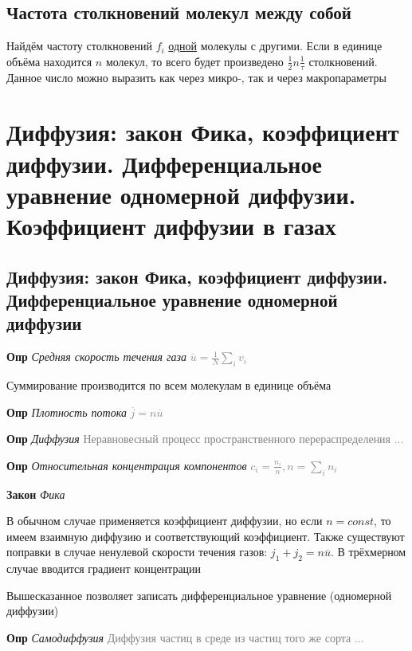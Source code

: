 \documentclass[a4paper, 14pt]{article}
\begin{document}
    \subsection{Частота столкновений молекул между собой}
    
    Найдём частоту столкновений $f_i$ \underline{одной} молекулы с другими.
    Если в единице объёма находится $n$ молекул, то всего будет произведено $\frac{1}{2}n \frac{1}{\tau}$ столкновений.
    Данное число можно выразить как через микро-, так и через макропараметры
    
    \section{Диффузия: закон Фика, коэффициент диффузии. Дифференциальное уравнение одномерной диффузии.
    Коэффициент диффузии в газах}
    
    \subsection{Диффузия: закон Фика, коэффициент диффузии. Дифференциальное уравнение одномерной диффузии}
    
    \textbf{Опр} \textit{Средняя скорость течения газа} \textcolor{gray}{$\overline{u} = \frac{1}{N} \sum_i v_i$}
    
    Суммирование производится по всем молекулам в единице объёма
    
    \textbf{Опр} \textit{Плотность потока} \textcolor{gray}{$\overline{j} = n\overline{u}$}
    
    \textbf{Опр} \textit{Диффузия} \textcolor{gray}{Неравновесный процесс пространственного перераспределения ...}
    
    \textbf{Опр} \textit{Относительная концентрация компонентов} \textcolor{gray}{$c_i = \frac{n_i}{n}, n = \sum_i n_i$}
    
    \textbf{Закон} \textit{Фика}
    
    В обычном случае применяется коэффициент диффузии, но если $n = const$, то имеем взаимную диффузию и
    соответствующий коэффициент.
    Также существуют поправки в случае ненулевой скорости течения газов: $j_1 + j_2 = n \overline{u}$.
    В трёхмерном случае вводится градиент концентрации
    
    Вышесказанное позволяет записать дифференциальное уравнение (одномерной диффузии)
    
    \textbf{Опр} \textit{Самодиффузия} \textcolor{gray}{Диффузия частиц в среде из частиц того же сорта ...}
    
\end{document}
